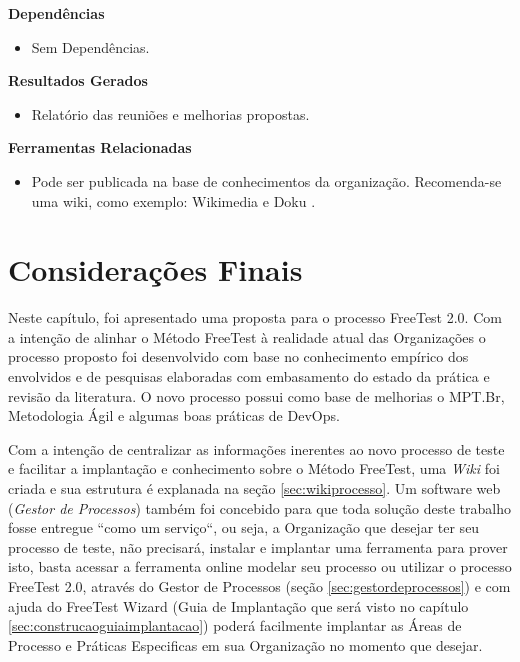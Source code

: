 \textbf{Dependências}
\begin{itemize}
    \item Sem Dependências.
\end{itemize}

\textbf{Resultados Gerados}
\begin{itemize}
    \item Relatório das reuniões e melhorias propostas.
\end{itemize}

\textbf{Ferramentas Relacionadas}
\begin{itemize}
    \item Pode ser publicada na base de conhecimentos da organização. Recomenda-se uma wiki, como exemplo: Wikimedia \cite{Wikimedia} e Doku \cite{Doku}.
\end{itemize}


\section{Considerações Finais}
\label{sec:consideracoesfinaiscap4}

Neste capítulo, foi apresentado uma proposta para o processo FreeTest 2.0. Com a intenção de alinhar o Método FreeTest à realidade atual das Organizações o processo proposto foi desenvolvido com base no conhecimento empírico dos envolvidos e de pesquisas elaboradas com embasamento do estado da prática e revisão da literatura. O novo processo possui como base de melhorias o MPT.Br, Metodologia Ágil e algumas boas práticas de DevOps. 

Com a intenção de centralizar as informações inerentes ao novo processo de teste e facilitar a implantação e conhecimento sobre o Método FreeTest, uma \textit{Wiki} foi criada e sua estrutura é explanada na seção \ref{sec:wikiprocesso}. Um software web (\textit{Gestor de Processos}) também foi concebido para que toda solução deste trabalho fosse entregue “como um serviço“, ou seja, a Organização que desejar ter seu processo de teste, não precisará, instalar e implantar uma ferramenta para prover isto, basta acessar a ferramenta online modelar seu processo ou utilizar o processo FreeTest 2.0, através do Gestor de Processos (seção \ref{sec:gestordeprocessos}) e com ajuda do FreeTest Wizard (Guia de Implantação que será visto no capítulo \ref{sec:construcaoguiaimplantacao}) poderá facilmente implantar as Áreas de Processo e Práticas Especificas em sua Organização no momento que desejar.